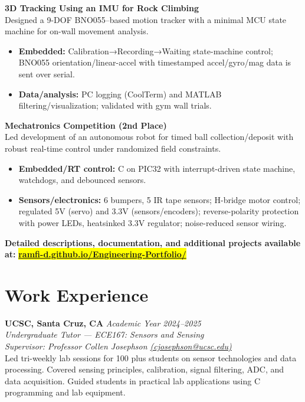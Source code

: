 \documentclass[a4paper,9pt]{article}
\begin{document}
\textbf{3D Tracking Using an IMU for Rock Climbing} \\
Designed a 9-DOF BNO055–based motion tracker with a minimal MCU state machine for on-wall movement analysis.
\begin{itemize}[leftmargin=*,itemsep=1pt,topsep=0pt,parsep=0pt,partopsep=0pt]
  \item \textbf{Embedded:} Calibration→Recording→Waiting state-machine control; BNO055 orientation/linear-accel with timestamped accel/gyro/mag data is sent over serial.
  \item \textbf{Data/analysis:} PC logging (CoolTerm) and MATLAB filtering/visualization; validated with gym wall trials.
\end{itemize}

\textbf{Mechatronics Competition (2nd Place)} \\
Led development of an autonomous robot for timed ball collection/deposit with robust real-time control under randomized field constraints.
\begin{itemize}[leftmargin=*,itemsep=1pt,topsep=0pt,parsep=0pt,partopsep=0pt]
  \item \textbf{Embedded/RT control:} C on PIC32 with interrupt-driven state machine, watchdogs, and debounced sensors. 
  \item \textbf{Sensors/electronics:} 6 bumpers, 5 IR tape sensors; H-bridge motor control; regulated 5V (servo) and 3.3V (sensors/encoders); reverse-polarity protection with power LEDs, heatsinked 3.3V regulator; noise-reduced sensor wiring.
\end{itemize}

\textbf{Detailed descriptions, documentation, and additional projects available at: }\colorbox{yellow}{\href{https://ramfi-d.github.io/Engineering-Portfolio/}{\textbf{ramfi-d.github.io/Engineering-Portfolio/}}}

\section*{Work Experience}
\small
\textbf{UCSC, Santa Cruz, CA} \hfill \textit{Academic Year 2024--2025} \\
\textit{Undergraduate Tutor — ECE167: Sensors and Sensing } \\
\textit{Supervisor: Professor Collen Josephson \href{mailto:cjosephson@ucsc.edu}{(cjosephson@ucsc.edu)}} \\[0.3em]
Led tri-weekly lab sessions for 100 plus students on sensor technologies and data processing. Covered sensing principles, calibration, signal filtering, ADC, and data acquisition. Guided students in practical lab applications using C programming and lab equipment.
\end{document}
